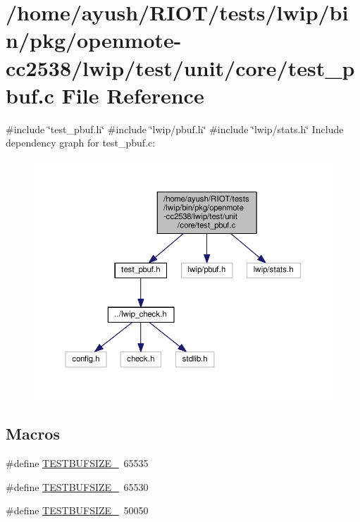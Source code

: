\hypertarget{openmote-cc2538_2lwip_2test_2unit_2core_2test__pbuf_8c}{}\section{/home/ayush/\+R\+I\+O\+T/tests/lwip/bin/pkg/openmote-\/cc2538/lwip/test/unit/core/test\+\_\+pbuf.c File Reference}
\label{openmote-cc2538_2lwip_2test_2unit_2core_2test__pbuf_8c}
{\ttfamily \#include \char`\"{}test\+\_\+pbuf.\+h\char`\"{}}\newline
{\ttfamily \#include \char`\"{}lwip/pbuf.\+h\char`\"{}}\newline
{\ttfamily \#include \char`\"{}lwip/stats.\+h\char`\"{}}\newline
Include dependency graph for test\+\_\+pbuf.\+c\+:
\nopagebreak
\begin{figure}[H]
\begin{center}
\leavevmode
\includegraphics[width=350pt]{openmote-cc2538_2lwip_2test_2unit_2core_2test__pbuf_8c__incl}
\end{center}
\end{figure}
\subsection*{Macros}
\begin{DoxyCompactItemize}
\item 
\#define \hyperlink{openmote-cc2538_2lwip_2test_2unit_2core_2test__pbuf_8c_aa8f228f4f82da39f9ff2b25f904ec26f}{T\+E\+S\+T\+B\+U\+F\+S\+I\+Z\+E\+\_}~65535
\item 
\#define \hyperlink{openmote-cc2538_2lwip_2test_2unit_2core_2test__pbuf_8c_a83b738083c9215c3c12d8540eda09112}{T\+E\+S\+T\+B\+U\+F\+S\+I\+Z\+E\+\_}~65530
\item 
\#define \hyperlink{openmote-cc2538_2lwip_2test_2unit_2core_2test__pbuf_8c_a6d676312b3590419fb822f83e4f23e75}{T\+E\+S\+T\+B\+U\+F\+S\+I\+Z\+E\+\_}~50050
\end{DoxyCompactItemize}
